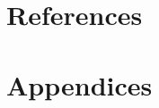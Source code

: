 \documentclass[preprint,12pt]{elsarticle}
\begin{document}

\section*{References}


\section*{Appendices}




\end{document}
